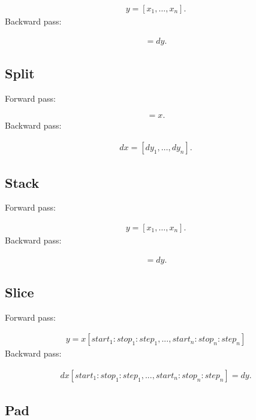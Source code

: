 \documentclass{article}
\begin{document}
\begin{eqnarray}
  y = [x_1, \ldots, x_n].
\end{eqnarray}
%
Backward pass:

\begin{eqnarray}
  [dx_1, \ldots, dx_n] = dy.
\end{eqnarray}


\subsection{Split}

Forward pass:

\begin{eqnarray}
  [y_1, \ldots, y_n] = x.
\end{eqnarray}
%
Backward pass:

\begin{eqnarray}
  dx = [dy_1, \ldots, dy_n].
\end{eqnarray}


\subsection{Stack}

Forward pass:

\begin{eqnarray}
  y = [x_1, \ldots, x_n].
\end{eqnarray}
%
Backward pass:

\begin{eqnarray}
  [dx_1, \ldots, dx_n] = dy.
\end{eqnarray}


\subsection{Slice}

Forward pass:

\begin{eqnarray}
  y = x[start_1:stop_1:step_1, ..., start_n:stop_n:step_n]
\end{eqnarray}
%
Backward pass:

\begin{eqnarray}
  dx[start_1:stop_1:step_1, ..., start_n:stop_n:step_n] = dy.
\end{eqnarray}


\subsection{Pad}
\end{document}
